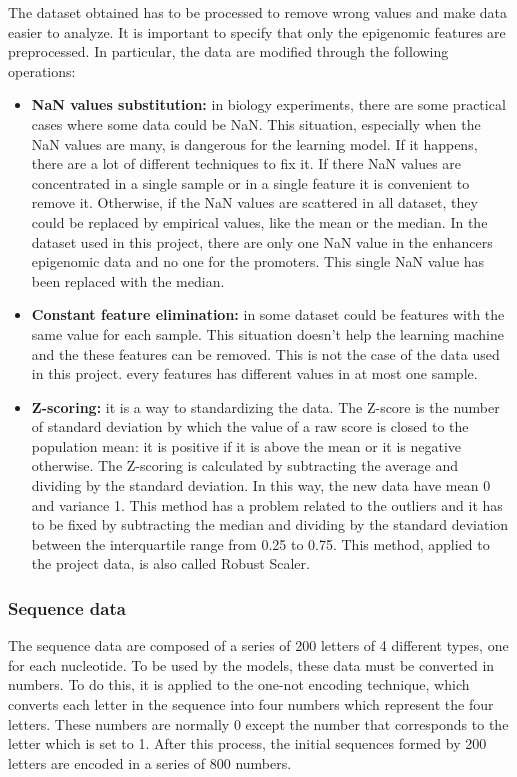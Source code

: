 The dataset obtained has to be processed to remove wrong values and make
data easier to analyze. It is important to specify that only the
epigenomic features are preprocessed. In particular, the data are
modified through the following operations:

\begin{itemize}
\item
  \textbf{NaN values substitution:} in biology experiments, there are
  some practical cases where some data could be NaN. This situation,
  especially when the NaN values are many, is dangerous for the learning
  model. If it happens, there are a lot of different techniques to fix
  it. If there NaN values are concentrated in a single sample or in a
  single feature it is convenient to remove it. Otherwise, if the NaN
  values are scattered in all dataset, they could be replaced by
  empirical values, like the mean or the median. In the dataset used in
  this project, there are only one NaN value in the enhancers epigenomic
  data and no one for the promoters. This single NaN value has been
  replaced with the median.
\item
  \textbf{Constant feature elimination:} in some dataset could be
  features with the same value for each sample. This situation doesn't
  help the learning machine and the these features can be removed. This
  is not the case of the data used in this project. every features has
  different values in at most one sample.
\item
  \textbf{Z-scoring:} it is a way to standardizing the data. The Z-score
  is the number of standard deviation by which the value of a raw score
  is closed to the population mean: it is positive if it is above the
  mean or it is negative otherwise. The Z-scoring is calculated by
  subtracting the average and dividing by the standard deviation. In
  this way, the new data have mean 0 and variance 1. This method has a
  problem related to the outliers and it has to be fixed by subtracting
  the median and dividing by the standard deviation between the
  interquartile range from 0.25 to 0.75. This method, applied to the
  project data, is also called Robust Scaler.
\end{itemize}

\subsubsection{Sequence data}

The sequence data are composed of a series of 200 letters of 4 different
types, one for each nucleotide. To be used by the models, these data
must be converted in numbers. To do this, it is applied to the one-not
encoding technique, which converts each letter in the sequence into four
numbers which represent the four letters. These numbers are normally 0
except the number that corresponds to the letter which is set to 1.
After this process, the initial sequences formed by 200 letters are
encoded in a series of 800 numbers.

